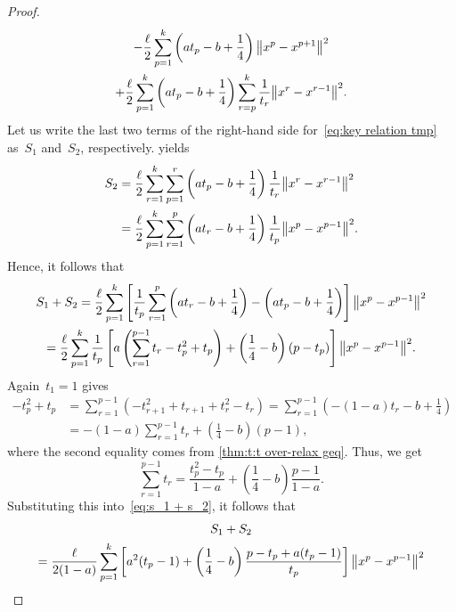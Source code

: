 \documentclass[../main]{subfiles}
\begin{document}
\begin{proof}
\begin{multline}
        - \frac{\ell}{2} \sum_{p = 1}^{k} \left( a t_p - b + \frac{1}{4} \right) \norm*{x^p - x^{p + 1}}^2 \\
        + \frac{\ell}{2} \sum_{p = 1}^{k} \left( a t_p - b + \frac{1}{4} \right) \sum_{r = p}^{k} \frac{1}{t_r} \norm*{x^r - x^{r - 1}}^2 
    .\end{multline}
    Let us write the last two terms of the right-hand side for~\cref{eq:key relation tmp} as~$S_1$ and~$S_2$, respectively.
     yields
    \[
        \begin{split}
            S_2 &= \frac{\ell}{2} \sum_{r = 1}^{k} \sum_{p = 1}^{r} \left( a t_p - b + \frac{1}{4} \right) \frac{1}{t_r} \norm*{x^r - x^{r - 1}}^2 \\
                &= \frac{\ell}{2} \sum_{p = 1}^{k} \sum_{r = 1}^{p} \left( a t_r - b + \frac{1}{4} \right) \frac{1}{t_p} \norm*{x^p - x^{p - 1}}^2
        .\end{split}
    \]
    Hence, it follows that
    \begin{multline} \label{eq:s_1 + s_2}
         S_1 + S_2 = \frac{\ell}{2} \sum_{p = 1}^{k} \left[ \frac{1}{t_p} \sum_{r = 1}^{p} \left( a t_r - b + \frac{1}{4} \right) - \left( a t_p - b + \frac{1}{4} \right) \right] \norm*{x^p - x^{p - 1}}^2 \\
         = \frac{\ell}{2} \sum_{p = 1}^{k} \frac{1}{t_p} \left[ a \left( \sum_{r = 1}^{p - 1} t_r - t_p^2 + t_p \right) + \left( \frac{1}{4} - b \right) (p - t_p) \right] \norm*{x^p - x^{p - 1}}^2
    .\end{multline}
    Again~$t_1 = 1$ gives
    \[
        \begin{split}
            - t_p^2 + t_p &= \sum_{r = 1}^{p - 1} ( - t_{r + 1}^2 + t_{r + 1} + t_r^2 - t_r ) = \sum_{r = 1}^{p - 1} \left(- (1 - a) t_r - b + \frac{1}{4} \right) \\
                          &= - (1 - a) \sum_{r = 1}^{p - 1} t_r + \left( \frac{1}{4} - b \right) (p - 1)
        ,\end{split}
    \]
    where the second equality comes from \cref{thm:t:t over-relax geq}.
    Thus, we get
    \[ \label{eq:sum t}
        \sum_{r = 1}^{p - 1} t_r = \frac{t_p^2 - t_p}{1 - a} + \left( \frac{1}{4} - b \right) \frac{p - 1}{1 - a}
    .\] 
    Substituting this into~\cref{eq:s_1 + s_2}, it follows that
    \begin{multline}
        S_1 + S_2 \\
        = \frac{\ell}{2 (1 - a)} \sum_{p = 1}^{k} \left[ a^2 (t_p - 1) + \left( \frac{1}{4} - b \right) \frac{p - t_p + a (t_p - 1)}{t_p} \right] \norm*{x^p - x^{p - 1}}^2

\end{multline}
\end{proof}
\end{document}
